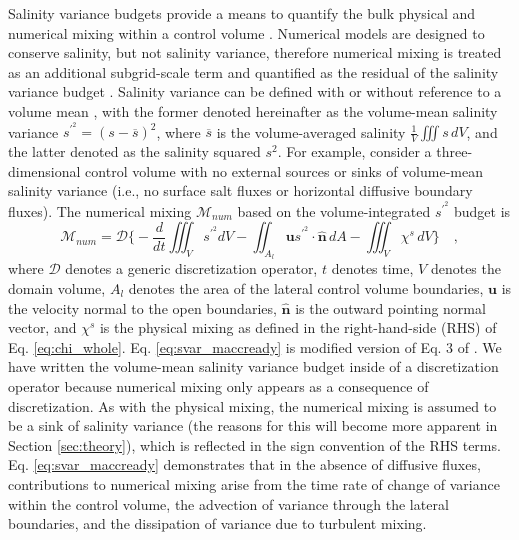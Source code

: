 Salinity variance budgets provide a means to quantify the bulk physical and numerical mixing within a control volume \citep{Li_2018, Lorenz_2021, Qu_2022_box}. Numerical models are designed to conserve salinity, but not salinity variance, therefore numerical mixing is treated as an additional subgrid-scale term and quantified as the residual of the salinity variance budget \citep{MacCready_2018}. Salinity variance can be defined with or without reference to a volume mean \citep{Burchard_2008, Qu_2022_box}, with the former denoted hereinafter as the volume-mean salinity variance $s^{\prime^2} = (s-\overline{s})^2$, where $\overline{s}$ is the volume-averaged salinity $\frac{1}{V} \iiint s \, dV$, and the latter denoted as the salinity squared $s^2$. For example, consider a three-dimensional control volume with no external sources or sinks of volume-mean salinity variance (i.e., no surface salt fluxes or horizontal diffusive boundary fluxes). The numerical mixing $\mathcal{M}_{num}$ based on the volume-integrated $s^{\prime^2}$ budget is
\begin{equation} \label{eq:svar_maccready}
    \mathcal{M}_{num} = \mathcal{D} \biggl\{-\frac{d}{dt} \iiint_V s^{\prime^2} dV - \iint_{A_l} \mathbf{u}s^{\prime^2} \cdot \hat{\mathbf{n}} \,  dA - \iiint_V \chi^s \, dV \biggl\} \quad ,
\end{equation}
where $\mathcal{D}$ denotes a generic discretization operator, $t$ denotes time, $V$ denotes the domain volume, $A_l$ denotes the area of the lateral control volume boundaries, $\mathbf{u}$ is the velocity normal to the open boundaries, $\hat{\mathbf{n}}$ is the outward pointing normal vector, and $\chi^s$ is the physical mixing as defined in the right-hand-side (RHS) of Eq. \ref{eq:chi_whole}. Eq. \ref{eq:svar_maccready} is modified version of Eq. 3 of \citet{MacCready_2018}. We have written the volume-mean salinity variance budget inside of a discretization operator because numerical mixing only appears as a consequence of discretization. As with the physical mixing, the numerical mixing is assumed to be a sink of salinity variance (the reasons for this will become more apparent in Section \ref{sec:theory}), which is reflected in the sign convention of the RHS terms. Eq. \ref{eq:svar_maccready} demonstrates that in the absence of diffusive fluxes, contributions to numerical mixing arise from the time rate of change of variance within the control volume, the advection of variance through the lateral boundaries, and the dissipation of variance due to turbulent mixing. 

